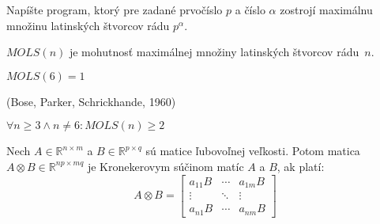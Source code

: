 \begin{exercise}
Napíšte program, ktorý pre zadané prvočíslo $p$ a číslo $\alpha$ zostrojí maximálnu množinu latinských štvorcov rádu $p^\alpha$.
\end{exercise}

\begin{definition}
$MOLS(n)$ je mohutnosť maximálnej množiny latinských štvorcov rádu~$n$.
\end{definition}

\begin{remark}
$MOLS(6) = 1$
\end{remark}

\begin{theorem_hard}{(Bose, Parker, Schrickhande, 1960)}

$\forall n \geq 3 \wedge n \neq 6: MOLS(n) \geq 2$

\end{theorem_hard}


\begin{definition}
Nech $A \in \mathbb{R}^{n\times m}$ a $B \in \mathbb{R}^{p \times q}$ sú matice ľubovoľnej veľkosti.
Potom matica $A \otimes B \in \mathbb{R}^{np \times mq}$ je Kronekerovym súčinom matíc $A$ a $B$, ak platí:
$$
A \otimes B = 
\begin{bmatrix} a_{1 1} B & \cdots & a_{1 m} B \\ \vdots & \ddots & \vdots \\ a_{n 1} B & \cdots & a_{n m} B
\end{bmatrix}
$$
\end{definition}

